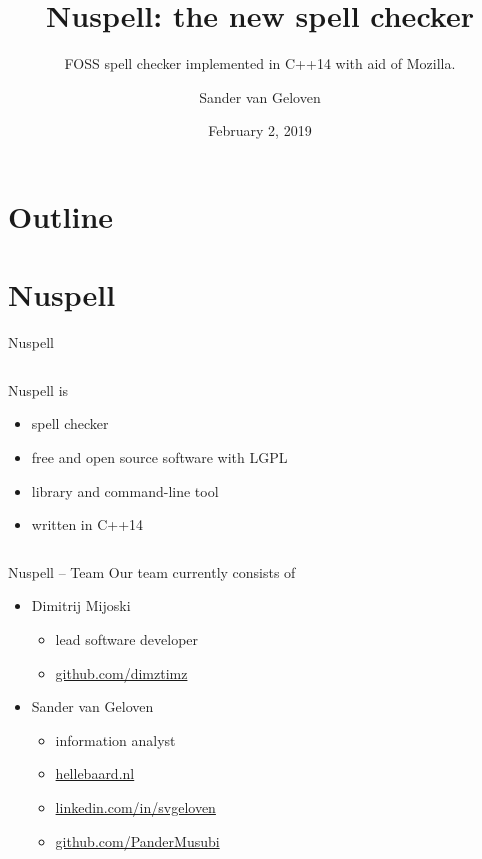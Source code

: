 \documentclass{beamer}
\title{Nuspell: the new spell checker}
\subtitle{FOSS spell checker implemented in C++14 with aid of Mozilla.}
\author{Sander van Geloven}
\institute{FOSDEM, Brussels}
\date{February 2, 2019}
\begin{document}
\begin{frame}
\titlepage
\end{frame}

\section*{Outline}
\begin{frame}
\tableofcontents
\end{frame}



\section{Nuspell}

\begin{frame}{Nuspell}
\begin{columns}
\begin{column}{0.5\textwidth}
Nuspell is
\\\mbox{}
\begin{itemize}
\item spell checker
\\\mbox{}
\item free and open source software with LGPL
\\\mbox{}
\item library and command-line tool
\\\mbox{}
\item written in C++14
\end{itemize}
\end{column}
\begin{column}{0.5\textwidth}
\end{column}
\end{columns}
\end{frame}

\begin{frame}{Nuspell – Team}
Our team currently consists of\\\mbox{}
\begin{itemize}
\item Dimitrij Mijoski
\begin{itemize}
\item lead software developer
\item \href{https://github.com/dimztimz}{github.com/dimztimz}
\end{itemize}
\mbox{}
\item Sander van Geloven
\begin{itemize}
\item information analyst
\item \href{http://hellebaard.nl}{hellebaard.nl}
\item \href{https://linkedin.com/in/svgeloven}{linkedin.com/in/svgeloven}
\item \href{https://github.com/PanderMusubi}{github.com/PanderMusubi}
\end{itemize}
\end{itemize}
\end{frame}
\end{document}
